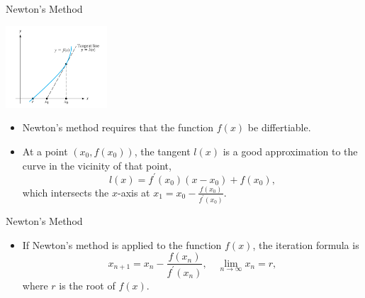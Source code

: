 \documentclass{beamer}
\begin{document}
\begin{frame}{Newton's Method}
\centerline{\includegraphics[height=1.2in]{Lec11_fig5.pdf}}  
\begin{itemize} 
  \item  Newton's method requires that the function $f(x)$ be differtiable.
  \item  At a point $(x_0, f (x_0))$, the tangent $l(x)$ is a  good approximation to the curve in the vicinity of that point,
 $$
l(x)=f^{\prime}\left(x_0\right)\left(x-x_0\right)+f\left(x_0\right),
$$
which intersects the $x$-axis at $x_1=x_0-\frac{f\left(x_0\right)}{f^{\prime}\left(x_0\right)}$.
\end{itemize}
\end{frame}
\begin{frame}{Newton's Method}
  \begin{itemize}
    \item If Newton's method is applied to the function $f(x)$, the iteration formula is
    $$
x_{n+1}=x_n-\frac{f\left(x_n\right)}{f^{\prime}\left(x_n\right)}, \quad \lim_{n \to \infty} x_n=r,
$$
    where $r$ is the root of $f(x)$. 
  \end{itemize}
\end{frame}
\end{document}
